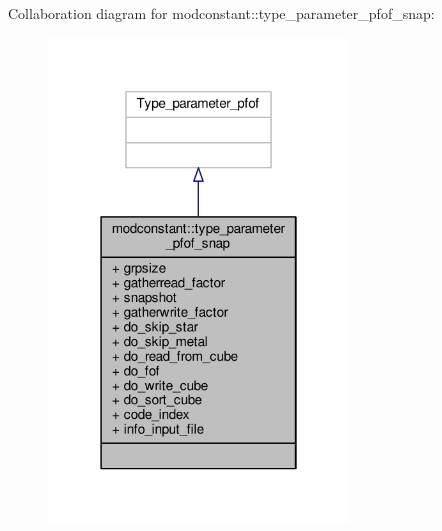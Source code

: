 Collaboration diagram for modconstant\+:\+:type\+\_\+parameter\+\_\+pfof\+\_\+snap\+:\nopagebreak
\begin{figure}[H]
\begin{center}
\leavevmode
\includegraphics[width=226pt]{structmodconstant_1_1type__parameter__pfof__snap__coll__graph}
\end{center}
\end{figure}
